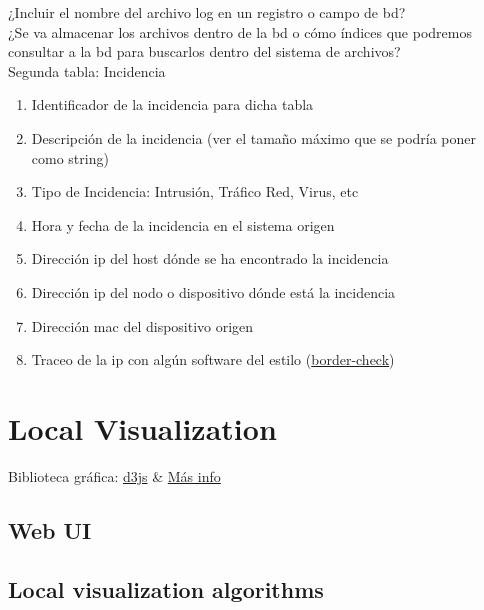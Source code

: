\documentclass[a4paper,12pt]{article}
\begin{document}
¿Incluir el nombre del archivo log en un registro o campo de bd?\\
¿Se va almacenar los archivos dentro de la bd o cómo índices que podremos consultar a la bd para buscarlos dentro del sistema de archivos?\\

Segunda tabla: Incidencia\\


\begin{enumerate}
\item Identificador de la incidencia para dicha tabla
\item Descripción de la incidencia (ver el tamaño máximo que se podría poner como string)
\item Tipo de Incidencia: Intrusión, Tráfico Red, Virus, etc
\item Hora y fecha de la incidencia en el sistema origen
\item Dirección ip del host dónde se ha encontrado la incidencia
\item Dirección ip del nodo o dispositivo dónde está la incidencia
\item Dirección mac del dispositivo origen
\item Traceo de la ip con algún software del estilo (\href{https://github.com/epsylon/Border-Check}{border-check}) 
\end{enumerate}

\section{Local Visualization}

Biblioteca gráfica: \href{http://d3js.org}{d3js} \& \href{http://bost.ocks.org/mike/selection/}{Más info}

\subsection{Web UI}

\subsection{Local visualization algorithms}
\end{document}
